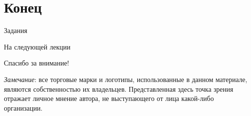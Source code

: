 \section*{Конец}

\begin{frame}{Задания}
\end{frame}

\begin{frame}{На следующей лекции}
\end{frame}

\begin{frame}

{\huge{Спасибо за внимание!}\par}

\vfill

\tiny{\textit{Замечание}: все торговые марки и логотипы, использованные в данном материале, являются собственностью их владельцев. Представленная здесь точка зрения отражает личное мнение автора, не выступающего от лица какой-либо организации.}

\end{frame}


